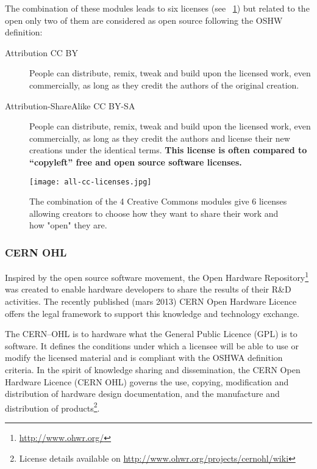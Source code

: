 The combination of these modules leads to six licenses (see \figurename~\ref{fig:all-cc-licenses}) but related to the open only two of them are considered as open source following the OSHW definition:
\begin{description}
    \item[Attribution CC BY] People can distribute, remix, tweak and build upon the licensed work, even commercially, as long as they credit the authors of the original creation.
    \item[Attribution-ShareAlike CC BY-SA] People can distribute, remix, tweak and build upon the licensed work, even commercially, as long as they credit the authors and license their new creations under the identical terms. \textbf{This license is often compared to “copyleft” free and open source software licenses.}
\end{description}

\begin{figure}[]
    \begin{center}
        \texttt{[image: all-cc-licenses.jpg]}
    \end{center}
    \caption{The combination of the 4 Creative Commons modules give 6 licenses allowing creators to choose how they want to share their work and how "open" they are.}
    \label{fig:all-cc-licenses}
\end{figure}

\subsubsection{CERN OHL} %

Inspired by the open source software movement, the Open Hardware Repository\footnote{\url{http://www.ohwr.org/}} was created to enable hardware developers to share the results of their R\&D activities. The recently published (mars 2013) CERN Open Hardware Licence offers the legal framework to support this knowledge and technology exchange.

The CERN–OHL is to hardware what the General Public Licence (GPL) is to software. It defines the conditions under which a licensee will be able to use or modify the licensed material and is compliant with the OSHWA definition criteria. In the spirit of knowledge sharing and dissemination, the CERN Open Hardware Licence (CERN OHL) governs the use, copying, modification and distribution of hardware design documentation, and the manufacture and distribution of products\footnote{License details available on \url{http://www.ohwr.org/projects/cernohl/wiki}}.


